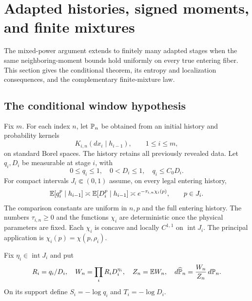\section{Adapted histories, signed moments, and finite mixtures}
\label{fp:sec:histories}\label{fp:app:history-scope}
The mixed-power argument extends to finitely many adapted stages when
the same neighboring-moment bounds hold uniformly on every true
entering fiber. This section gives the conditional theorem, its entropy
and localization consequences, and the complementary finite-mixture law.

\subsection{The conditional window hypothesis}
Fix $m$. For each index $n$, let $\mathbb P_n$ be obtained from an initial history and probability kernels
\[
 K_{i,n}(dx_i\mid h_{i-1}),\qquad 1\le i\le m,
\]
on standard Borel spaces. The history retains all previously revealed data. Let $q_i,D_i$ be measurable at stage $i$, with
\[
 0\le q_i\le1,\quad0<D_i\le1,\quad q_i\le C_0D_i.
\]
For compact intervals $J_i\Subset(0,1)$ assume, on every legal entering history,
\begin{equation}\label{fp:eq:conditional-window}
 \mathbb E[q_i^p\mid h_{i-1}]\asymp
 \mathbb E[D_i^p\mid h_{i-1}]\asymp
 e^{-\tau_{i,n}\chi_i(p)},\qquad p\in J_i.
\end{equation}
The comparison constants are uniform in $n,p$ and the full entering history. The numbers $\tau_{i,n}\ge0$ and the functions $\chi_i$ are deterministic once the physical parameters are fixed. Each $\chi_i$ is concave and locally $C^{1,1}$ on $\operatorname{int}J_i$. The principal application is $\chi_i(p)=\chi(p,\rho_i)$.

Fix $\eta_i\in\operatorname{int}J_i$ and put
\begin{equation}\label{fp:eq:history-weight}
 R_i=q_i/D_i,\quad W_n=\prod_iR_iD_i^{\eta_i},\quad
 Z_n=\mathbb E W_n,\quad d\widehat{\mathbb P}_n=\frac{W_n}{Z_n}\,d\mathbb P_n.
\end{equation}
On its support define $S_i=-\log q_i$ and $T_i=-\log D_i$.

